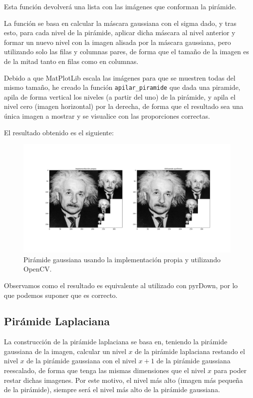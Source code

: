 \documentclass[12pt, spanish]{article}
\begin{document}
Esta función devolverá una lista con las imágenes que conforman la pirámide.

La función se basa en calcular la máscara gaussiana con el sigma dado, y tras esto, para cada nivel de la pirámide, aplicar dicha máscara al nivel anterior y formar un nuevo nivel con la imagen alisada por la máscara gaussiana, pero utilizando solo las filas y columnas pares, de forma que el tamaño de la imagen es de la mitad tanto en filas como en columnas.


Debido a que MatPlotLib escala las imágenes para que se muestren todas del mismo tamaño, he creado la función \texttt{apilar\_piramide} que dada una piramide, apila de forma vertical los niveles (a partir del uno) de la pirámide, y apila el nivel cero (imagen horizontal) por la derecha, de forma que el resultado sea una única imagen a mostrar y se visualice con las proporciones correctas.

El resultado obtenido es el siguiente:


\begin{figure}[H]
  \centering
      \includegraphics[width=\textwidth]{ej2AG.png}
 		 \caption{Pirámide gaussiana usando la implementación propia y utilizando OpenCV.}
  		\label{fig:ej2ag}

\end{figure}

Observamos como el resultado es equivalente al utilizado con pyrDown, por lo que podemos suponer que es correcto.

\subsection{Pirámide Laplaciana}

La construcción de la pirámide laplaciana se basa en, teniendo la pirámide gaussiana de la imagen, calcular un nivel $x$ de la pirámide laplaciana restando el nivel $x$ de la pirámide gaussiana con el nivel $x+1$ de la pirámide gaussiana reescalado, de forma que tenga las mismas dimensiones que el nivel $x$ para poder restar dichas imagenes. Por este motivo, el nivel más alto (imagen más pequeña de la pirámide), siempre será el nivel más alto de la pirámide gaussiana.
\end{document}
